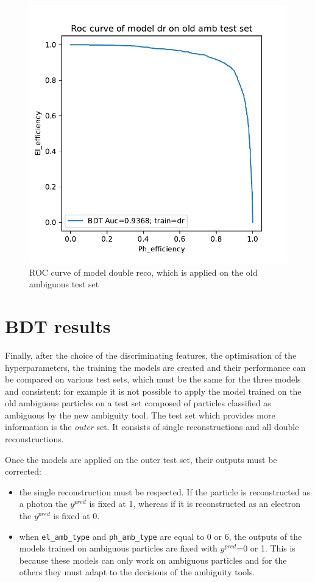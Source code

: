 \documentclass[a4paper, oneside]{book}
\begin{document}
			\begin{figure}[H] 
				\centering
				\includegraphics[width=.6\linewidth]{tesi_images/dr_old.pdf} 
				\caption{ROC curve of model double reco, which is applied on the old ambiguous test set} 
				\label{fig:ex_roc}
			\end{figure}
		\section{BDT results}
			Finally, after the choice of the discriminating features, the optimisation of the hyperparameters, the training the models are created and their performance can be compared on various test sets, which must be the same for the three models and consistent: for example it is not possible to apply the model trained on the old ambiguous particles on a test set composed of particles classified as ambiguous by the new ambiguity tool. The test set which provides more information is the \textit{outer} set. It consists of single reconstructions and all double reconstructions.
			
			Once the models are applied on the outer test set, their outputs must be corrected:
			\begin{itemize}
				\item the single reconstruction must be respected. If the particle is reconstructed as a photon the $y^{pred}$ is fixed at 1, whereas if it is reconstructed as an electron the $y^{pred}$ is fixed at 0.
				\item when \texttt{el\_amb\_type} and \texttt{ph\_amb\_type} are equal to 0 or 6, the outputs of the models trained on ambiguous particles are fixed with $y^{pred}$=0 or 1. This is because these models can only work on ambiguous particles and for the others they must adapt to the decisions of the ambiguity tools.
			\end{itemize}
			
\end{document}
